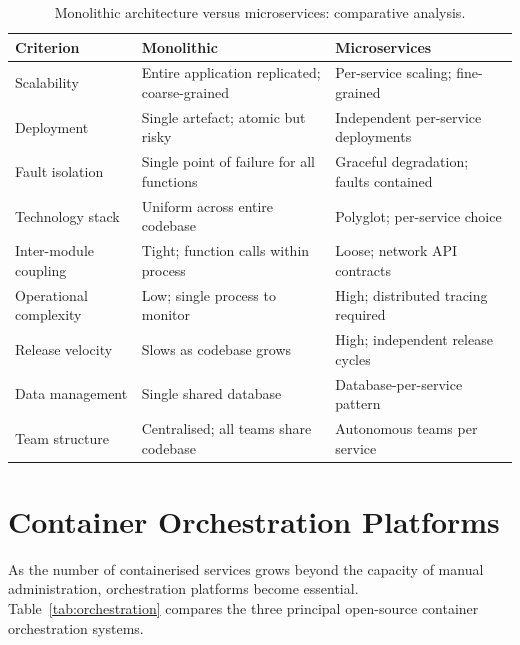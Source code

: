 \documentclass[12pt,a4paper]{report}
\begin{document}
\begin{table}[htbp]
\centering
\caption{Monolithic architecture versus microservices: comparative analysis.}
\label{tab:mono_micro}
\begin{tabular}{L{3.2cm} L{5.5cm} L{5.5cm}}
\toprule
\textbf{Criterion} & \textbf{Monolithic} & \textbf{Microservices} \\
\midrule
Scalability         & Entire application replicated; coarse-grained & Per-service scaling; fine-grained \\
\addlinespace
Deployment          & Single artefact; atomic but risky & Independent per-service deployments \\
\addlinespace
Fault isolation     & Single point of failure for all functions & Graceful degradation; faults contained \\
\addlinespace
Technology stack    & Uniform across entire codebase & Polyglot; per-service choice \\
\addlinespace
Inter-module coupling & Tight; function calls within process & Loose; network API contracts \\
\addlinespace
Operational complexity & Low; single process to monitor & High; distributed tracing required \\
\addlinespace
Release velocity    & Slows as codebase grows & High; independent release cycles \\
\addlinespace
Data management     & Single shared database & Database-per-service pattern \\
\addlinespace
Team structure      & Centralised; all teams share codebase & Autonomous teams per service \\
\bottomrule
\end{tabular}
\end{table}

\section{Container Orchestration Platforms}

As the number of containerised services grows beyond the capacity of manual
administration, orchestration platforms become essential. Table~\ref{tab:orchestration}
compares the three principal open-source container orchestration systems.
\end{document}
